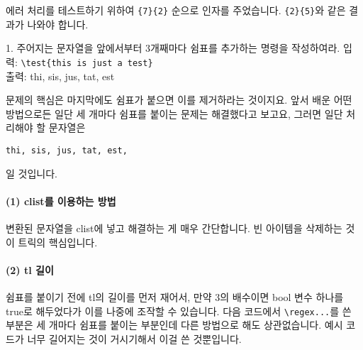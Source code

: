 \documentclass[a4paper,amsmath]{oblivoir}
\begin{document}
에러 처리를 테스트하기 위하여 \verb|{7}{2}| 순으로 인자를 주었습니다. \verb|{2}{5}|와 같은 결과가 나와야 합니다.


\clearpage


\begin{questionp}
 1. 주어지는 문자열을 앞에서부터 3개째마다 쉼표를 추가하는 명령을 작성하여라.
\tcblower
입력: \verb|\test{this is just a test}| \\
출력: thi, sis, jus, tat, est
\end{questionp}

문제의 핵심은 마지막에도 쉼표가 붙으면 이를 제거하라는 것이지요.
앞서 배운 어떤 방법으로든 일단 세 개마다 쉼표를 붙이는 문제는 해결했다고 보고요, 그러면 일단 처리해야 할 문자열은 
\begin{verbatim}
thi, sis, jus, tat, est,
\end{verbatim}
일 것입니다.

\paragraph{(1) clist를 이용하는 방법}

변환된 문자열을 clist에 넣고 해결하는 게 매우 간단합니다. 빈 아이템을 삭제하는 것이 트릭의 핵심입니다.


\paragraph{(2) tl 길이}

쉼표를 붙이기 전에 tl의 길이를 먼저 재어서, 만약 3의 배수이면 bool 변수 하나를 true로 해두었다가 이를 나중에 조작할 수 있습니다. 다음 코드에서 \verb|\regex...|를 쓴 부분은 세 개마다 쉼표를 붙이는 부분인데 다른 방법으로 해도 상관없습니다. 예시 코드가 너무 길어지는 것이 거시기해서 이걸 쓴 것뿐입니다.
\end{document}
